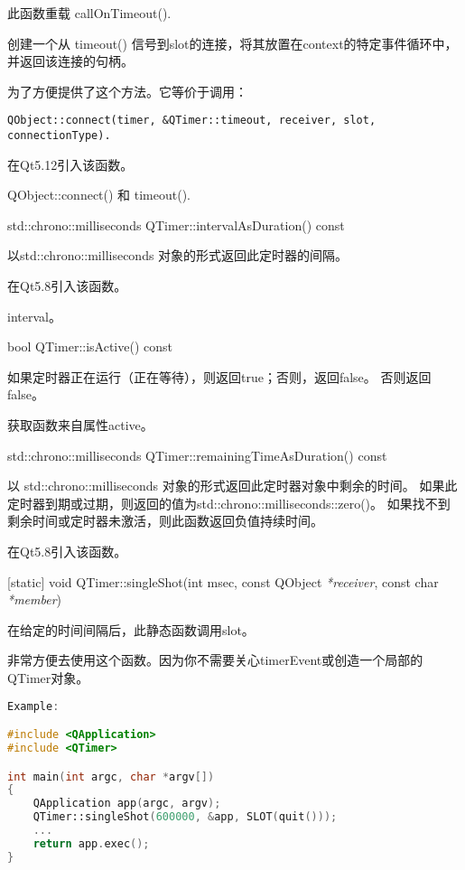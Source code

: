 此函数重载 callOnTimeout().

创建一个从 timeout() 信号到slot的连接，将其放置在context的特定事件循环中，并返回该连接的句柄。

为了方便提供了这个方法。它等价于调用：


\begin{lstlisting}
QObject::connect(timer, &QTimer::timeout, receiver, slot, connectionType).
\end{lstlisting}
	
在Qt5.12引入该函数。
	
\begin{seeAlso}
QObject::connect() 和 timeout().
\end{seeAlso}

% 
std::chrono::milliseconds QTimer::intervalAsDuration() const

以std::chrono::milliseconds 对象的形式返回此定时器的间隔。

在Qt5.8引入该函数。

\begin{seeAlso}
interval。
\end{seeAlso}

bool QTimer::isActive() const

如果定时器正在运行（正在等待），则返回true；否则，返回false。 否则返回false。

\begin{notice}
获取函数来自属性active。
\end{notice}

std::chrono::milliseconds QTimer::remainingTimeAsDuration() const

以 std::chrono::milliseconds 对象的形式返回此定时器对象中剩余的时间。 
如果此定时器到期或过期，则返回的值为std::chrono::milliseconds::zero()。 
如果找不到剩余时间或定时器未激活，则此函数返回负值持续时间。

在Qt5.8引入该函数。

[static] void QTimer::singleShot(int msec, const QObject \emph{*receiver}, const char \emph{*member})

在给定的时间间隔后，此静态函数调用slot。

非常方便去使用这个函数。因为你不需要关心timerEvent或创造一个局部的QTimer对象。

\begin{lstlisting}[language=C++]
Example:

#include <QApplication>
#include <QTimer>

int main(int argc, char *argv[])
{
	QApplication app(argc, argv);
	QTimer::singleShot(600000, &app, SLOT(quit()));
	...
	return app.exec();
}
\end{lstlisting}

